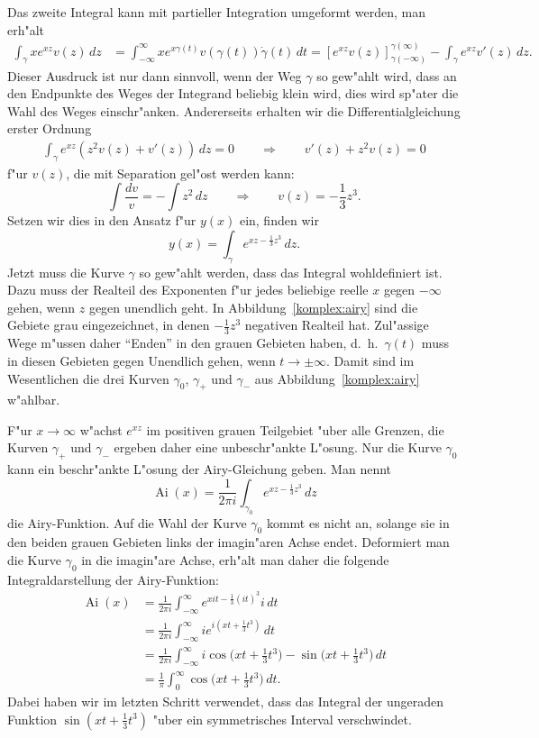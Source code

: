 Das zweite Integral kann mit partieller Integration umgeformt werden,
man erh"alt
\begin{align*}
\int_\gamma xe^{xz}v(z)\,dz
&=
\int_{-\infty}^{\infty} xe^{x\gamma(t)}v(\gamma(t))\dot\gamma(t)\,dt
=
\left[e^{xz}v(z)\right]_{\gamma(-\infty)}^{\gamma(\infty)}
-\int_\gamma e^{xz}v'(z)\,dz.
\end{align*}
Dieser Ausdruck ist nur dann sinnvoll, wenn der Weg $\gamma$ so gew"ahlt
wird, dass an den Endpunkte des Weges der Integrand beliebig klein wird,
dies wird sp"ater die Wahl des Weges einschr"anken.
Andererseits erhalten wir die Differentialgleichung erster Ordnung
\begin{align*}
\int_\gamma e^{xz}(z^2v(z)+v'(z))\,dz=0
\qquad
\Rightarrow
\qquad
v'(z)+z^2v(z)=0
\end{align*}
f"ur $v(z)$, die mit Separation gel"ost werden kann:
\[
\int \frac{dv}{v}=-\int z^2\,dz
\qquad\Rightarrow\qquad
v(z)=-\frac13z^3.
\]
Setzen wir dies in den Ansatz f"ur $y(x)$ ein, finden wir
\[
y(x)=\int_\gamma e^{xz-\frac13z^3}\,dz.
\]
Jetzt muss die Kurve $\gamma$ so gew"ahlt werden, dass das Integral
wohldefiniert ist. 
Dazu muss der Realteil des Exponenten f"ur jedes beliebige reelle $x$ 
gegen $-\infty$ gehen, wenn $z$ gegen unendlich geht.
In Abbildung~\ref{komplex:airy} sind die Gebiete grau eingezeichnet,
in denen $-\frac13z^3$ negativen Realteil hat.
Zul"assige Wege m"ussen daher ``Enden'' in den grauen Gebieten haben,
d.~h.~$\gamma(t)$ muss in diesen Gebieten gegen Unendlich gehen, wenn
$t\to\pm\infty$.
Damit sind im Wesentlichen die drei Kurven $\gamma_0$, $\gamma_+$ und
$\gamma_-$ aus Abbildung~\ref{komplex:airy} w"ahlbar.

F"ur $x\to\infty$ w"achst $e^{xz}$ im positiven grauen Teilgebiet
"uber alle Grenzen, die Kurven $\gamma_+$ und $\gamma_-$ ergeben daher
eine unbeschr"ankte L"osung.
Nur die Kurve $\gamma_0$ kann ein beschr"ankte L"osung der Airy-Gleichung
geben.
Man nennt
\[
\operatorname{Ai}(x)
=
\frac{1}{2\pi i}\int_{\gamma_0} e^{xz-\frac13z^3}\,dz
\]
die Airy-Funktion.
%
%
%
Auf die Wahl der Kurve $\gamma_0$ kommt es nicht an, solange sie in den
beiden grauen Gebieten links der imagin"aren Achse endet.
Deformiert man die Kurve $\gamma_0$ in die imagin"are Achse, erh"alt
man daher die folgende Integraldarstellung der Airy-Funktion:
\begin{align*}
\operatorname{Ai}(x)
&=
\frac1{2\pi i}\int_{-\infty}^{\infty} e^{xit-\frac13(it)^3}i\,dt
\\
&=\frac{1}{2\pi i}\int_{-\infty}^{\infty} ie^{i(xt+\frac13t^3)}\,dt
\\
&=
\frac{1}{2\pi i}\int_{-\infty}^{\infty}
i\cos\biggl(xt+\frac13t^3\biggr)-\sin\biggl(xt+\frac13t^3\biggr)\,dt
\\
&=\frac{1}{\pi}\int_0^{\infty}\cos\biggl(xt+\frac13t^3\biggr)\,dt.
\end{align*}
Dabei haben wir im letzten Schritt verwendet, dass das Integral der
ungeraden Funktion $\sin(xt+\frac13t^3)$ "uber ein symmetrisches
Interval verschwindet.

